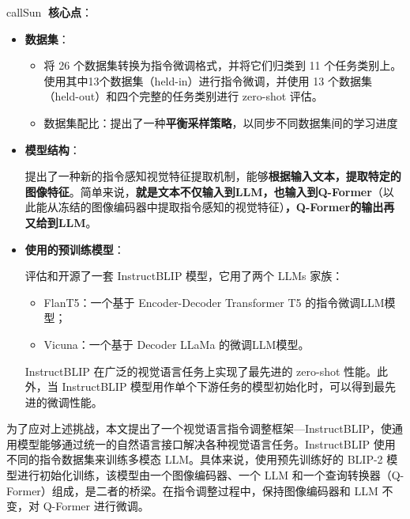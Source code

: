 \documentclass[zihao=false,fontset=windows]{ctexart}
\begin{document}
\begin{feishubox}{callSun}{🌟}
\textcolor{feishuRed}{\textbf{核心点}}：\par

\begin{itemize}
\item \textbf{数据集}：\par
\begin{itemize}
\item 将 26 个数据集转换为指令微调格式，并将它们归类到 11 个任务类别上。使用其中13个数据集（held-in）进行指令微调，并使用 13 个数据集（held-out）和四个完整的任务类别进行 zero-shot 评估。

\item 数据集配比：提出了一种\textbf{平衡采样策略}，以同步不同数据集间的学习进度

\end{itemize}
\item \textbf{模型结构}：\par
提出了一种新的指令感知视觉特征提取机制，能够\textbf{根据输入文本，提取特定的图像特征}。简单来说，\textbf{就是文本不仅输入到LLM，也输入到Q-Former}（\textcolor{feishuBlue}{以此能从冻结的图像编码器中提取指令感知的视觉特征}）\textbf{，Q-Former的输出再又给到LLM}。\par

\item \textbf{使用的预训练模型}：\par
评估和开源了一套 InstructBLIP 模型，它用了两个 LLMs 家族：\par

\begin{itemize}
\item FlanT5：一个基于 Encoder-Decoder Transformer T5 的指令微调LLM模型；

\item Vicuna：一个基于 Decoder LLaMa 的微调LLM模型。

\end{itemize}
InstructBLIP 在广泛的视觉语言任务上实现了最先进的 zero-shot 性能。此外，当 InstructBLIP 模型用作单个下游任务的模型初始化时，可以得到最先进的微调性能。\par

\end{itemize}
\end{feishubox}


为了应对上述挑战，本文提出了一个视觉语言指令调整框架—InstructBLIP，使通用模型能够通过统一的自然语言接口解决各种视觉语言任务。InstructBLIP 使用不同的指令数据集来训练多模态 LLM。具体来说，使用预先训练好的 BLIP-2 模型进行初始化训练，该模型由一个图像编码器、一个 LLM 和一个查询转换器（Q-Former）组成，是二者的桥梁。在指令调整过程中，保持图像编码器和 LLM 不变，对 Q-Former 进行微调。\par
\end{document}
